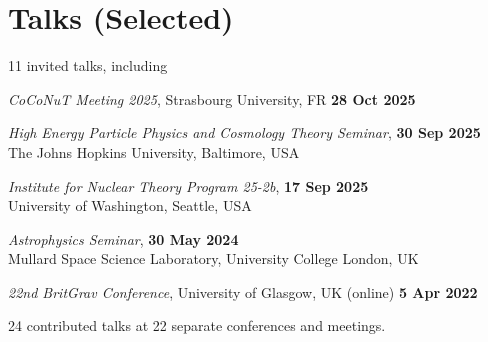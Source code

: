 \newcommand{\playsymbol}{$\blacktriangleright$}

\section{Talks (Selected)}

11 invited talks, including
%
\begin{etaremune}
    \item \textit{CoCoNuT Meeting 2025}, Strasbourg University, FR \hfill \textbf{28 Oct 2025}
    \item \textit{High Energy Particle Physics and Cosmology Theory Seminar},
    \hfill \textbf{30 Sep 2025} \\
    The Johns Hopkins University, Baltimore, USA
    \item \textit{Institute for Nuclear Theory Program 25-2b},
    \hfill \textbf{17 Sep 2025} \\
    University of Washington, Seattle, USA
    \item \textit{Astrophysics Seminar}, \hfill \textbf{30 May 2024} \\
    Mullard Space Science Laboratory, University College London, UK
    \item \textit{22nd BritGrav Conference}, University of Glasgow, UK (online)
    \hfill \textbf{5 Apr 2022}
\end{etaremune}
%
24 contributed talks at 22 separate conferences and meetings.


